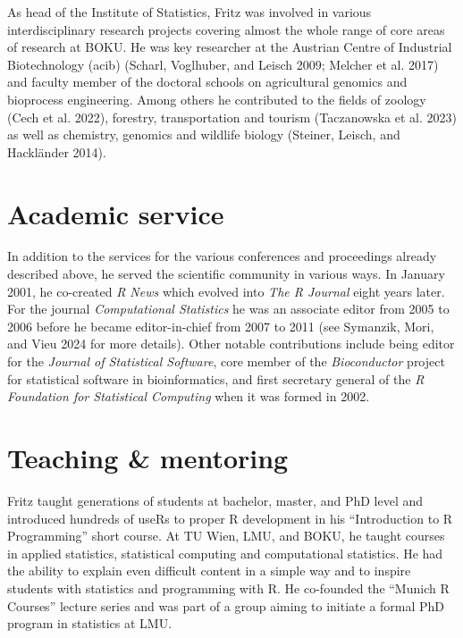 As head of the Institute of Statistics, Fritz was involved
in various interdisciplinary research projects covering almost the whole
range of core areas of research at BOKU. He was key researcher at the
Austrian Centre of Industrial Biotechnology (acib)
(Scharl, Voglhuber, and Leisch 2009; Melcher et al. 2017) and
faculty member of the doctoral schools on agricultural genomics and
bioprocess engineering. Among others he contributed to the fields of
zoology (Cech et al. 2022), forestry, transportation and tourism
(Taczanowska et al. 2023) as well as chemistry, genomics and wildlife
biology (Steiner, Leisch, and Hackländer 2014).

\hypertarget{academic-service}{%
\section{Academic service}\label{academic-service}}

In addition to the services for the various conferences and proceedings
already described above, he served the scientific community in various ways.
In January 2001, he co-created \emph{R News} which evolved into
\emph{The R Journal} eight years later. For the journal \emph{Computational Statistics}
he was an associate editor from 2005 to 2006 before he became editor-in-chief
from 2007 to 2011 (see Symanzik, Mori, and Vieu 2024 for more details).
Other notable contributions include being
editor for the \emph{Journal of Statistical Software}, core member of the
\emph{Bioconductor} project for statistical software in bioinformatics, and
first secretary general of the \emph{R Foundation for Statistical Computing} when
it was formed in 2002.

\hypertarget{teaching-mentoring}{%
\section{Teaching \& mentoring}\label{teaching-mentoring}}

Fritz taught generations of students at bachelor, master, and PhD level and
introduced hundreds of useRs to proper R development in his ``Introduction to
R Programming'' short course. At TU Wien, LMU, and BOKU, he taught courses in applied
statistics, statistical computing and computational statistics. He had the
ability to explain even difficult content in a simple way and to inspire students
with statistics and programming with R. He
co-founded the ``Munich R Courses'' lecture series and was part of a group
aiming to initiate a formal PhD program in statistics at LMU.

